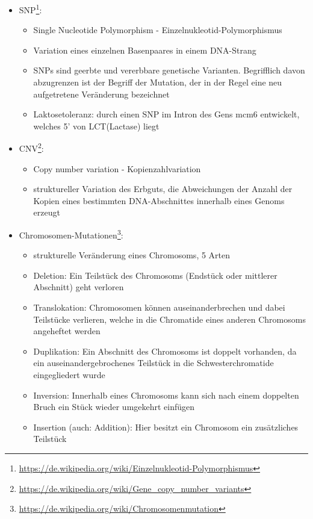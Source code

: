 \begin{itemize}
	\item SNP\footnote{\url{https://de.wikipedia.org/wiki/Einzelnukleotid-Polymorphismus}}:
	\begin{itemize}
		\item Single Nucleotide Polymorphism - Einzelnukleotid-Polymorphismus
		\item Variation eines einzelnen Basenpaares in einem DNA-Strang
		\item SNPs sind geerbte und vererbbare genetische Varianten. Begrifflich davon abzugrenzen ist der Begriff der Mutation, der in der Regel eine neu aufgetretene Veränderung bezeichnet
		\item Laktosetoleranz: durch einen SNP im Intron des Gens mcm6 entwickelt, welches 5' von LCT(Lactase) liegt
	\end{itemize}
	\item CNV\footnote{\url{https://de.wikipedia.org/wiki/Gene_copy_number_variants}}:
	\begin{itemize}
		\item Copy number variation - Kopienzahlvariation
		\item struktureller Variation des Erbguts, die Abweichungen der Anzahl der Kopien eines bestimmten DNA-Abschnittes innerhalb eines Genoms erzeugt
	\end{itemize}
	\item Chromosomen-Mutationen\footnote{\url{https://de.wikipedia.org/wiki/Chromosomenmutation}}:
	\begin{itemize}
		\item strukturelle Veränderung eines Chromosoms, 5 Arten
		\item Deletion: Ein Teilstück des Chromosoms (Endstück oder mittlerer Abschnitt) geht verloren
    	\item Translokation: Chromosomen können auseinanderbrechen und dabei Teilstücke verlieren, welche in die Chromatide eines anderen Chromosoms angeheftet werden
	    \item Duplikation: Ein Abschnitt des Chromosoms ist doppelt vorhanden, da ein auseinandergebrochenes Teilstück in die Schwesterchromatide eingegliedert wurde
	    \item Inversion: Innerhalb eines Chromosoms kann sich nach einem doppelten Bruch ein Stück wieder umgekehrt einfügen
	    \item Insertion (auch: Addition): Hier besitzt ein Chromosom ein zusätzliches Teilstück
	\end{itemize}
\end{itemize}

